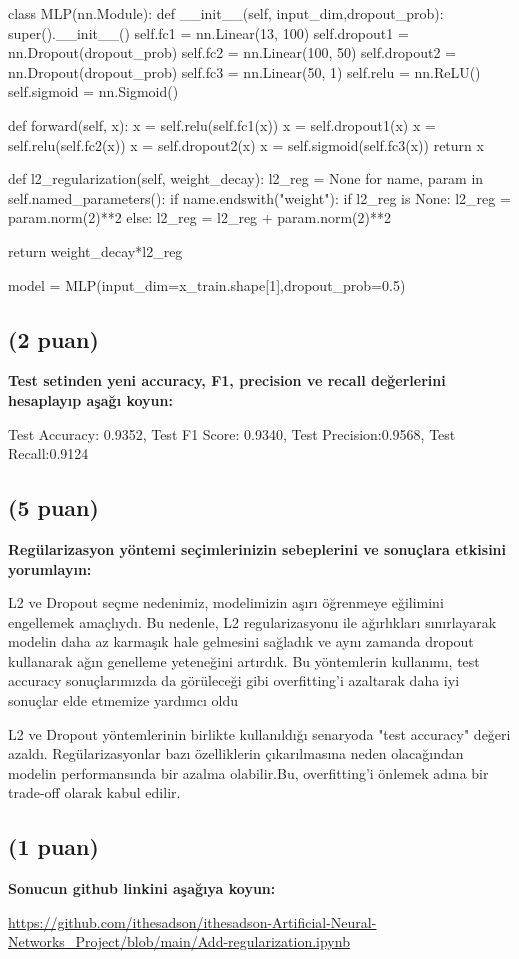 \documentclass[11pt]{article}
\begin{document}
\begin{python}
class MLP(nn.Module):
    def __init__(self, input_dim,dropout_prob):
        super().__init__()
        self.fc1 = nn.Linear(13, 100)
        self.dropout1 = nn.Dropout(dropout_prob)
        self.fc2 = nn.Linear(100, 50)
        self.dropout2 = nn.Dropout(dropout_prob)
        self.fc3 = nn.Linear(50, 1)
        self.relu = nn.ReLU()
        self.sigmoid = nn.Sigmoid()

    def forward(self, x):
        x = self.relu(self.fc1(x))
        x = self.dropout1(x)
        x = self.relu(self.fc2(x))
        x = self.dropout2(x)
        x = self.sigmoid(self.fc3(x))
        return x
    
    def l2_regularization(self, weight_decay):
        l2_reg = None
        for name, param in self.named_parameters():
            if name.endswith("weight"):
                if l2_reg is None:
                    l2_reg = param.norm(2)**2
                else:
                    l2_reg = l2_reg + param.norm(2)**2

        return weight_decay*l2_reg

model = MLP(input_dim=x_train.shape[1],dropout_prob=0.5)
\end{python}

\subsection{(2 puan)} \textbf{Test setinden yeni accuracy, F1, precision ve recall değerlerini hesaplayıp aşağı koyun:}

Test Accuracy: 0.9352, Test F1 Score: 0.9340, Test Precision:0.9568, Test Recall:0.9124

\subsection{(5 puan)} \textbf{Regülarizasyon yöntemi seçimlerinizin sebeplerini ve sonuçlara etkisini yorumlayın:}

L2 ve Dropout seçme nedenimiz, modelimizin aşırı öğrenmeye eğilimini engellemek amaçlıydı. Bu nedenle, L2 regularizasyonu ile ağırlıkları sınırlayarak modelin daha az karmaşık hale gelmesini sağladık ve aynı zamanda dropout kullanarak ağın genelleme yeteneğini artırdık. Bu yöntemlerin kullanımı, test accuracy sonuçlarımızda da görüleceği gibi overfitting'i azaltarak daha iyi sonuçlar elde etmemize yardımcı oldu

L2 ve Dropout yöntemlerinin birlikte kullanıldığı senaryoda "test accuracy" değeri azaldı.
Regülarizasyonlar bazı özelliklerin çıkarılmasına neden olacağından modelin performansında bir azalma olabilir.Bu, overfitting'i önlemek adına bir trade-off olarak kabul edilir.

\subsection{(1 puan)} \textbf{Sonucun github linkini  aşağıya koyun:}

\url{https://github.com/ithesadson/ithesadson-Artificial-Neural-Networks_Project/blob/main/Add-regularization.ipynb}
\end{document}

